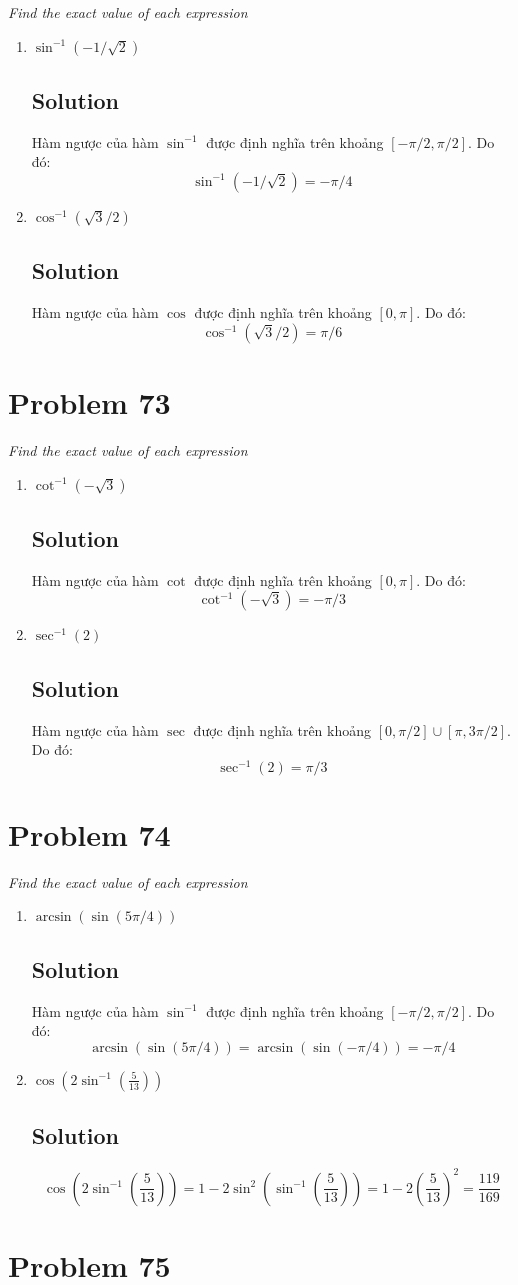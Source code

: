 \documentclass[11pt]{article}
\newcommand{\soln}{\subsection*}
\newcommand{\qn}{\textit}
\begin{document}
\qn{Find the exact value of each expression}
\begin{enumerate}
	\item \qn{$\sin^{-1}(-1/\sqrt{2})$}
	\soln{Solution}
	Hàm ngược của hàm $\sin^{-1}$ được định nghĩa trên khoảng $[-\pi/2,\pi/2]$. Do đó: $$\sin^{-1}(-1/\sqrt{2})=-\pi/4$$
	
	\item \qn{$\cos^{-1}(\sqrt{3}/2)$}
	\soln{Solution}
	Hàm ngược của hàm $\cos$ được định nghĩa trên khoảng $[0,\pi]$. Do đó: $$\cos^{-1}(\sqrt{3}/2)=\pi/6$$
\end{enumerate}

\section*{Problem 73}

\qn{Find the exact value of each expression}
\begin{enumerate}
	\item \qn{$\cot^{-1}(-\sqrt{3})$}
	\soln{Solution}
	Hàm ngược của hàm $\cot$ được định nghĩa trên khoảng $[0,\pi]$. Do đó: $$\cot^{-1}(-\sqrt{3})=-\pi/3$$
	
	\item \qn{$\sec^{-1}(2)$}
	\soln{Solution}
	Hàm ngược của hàm $\sec$ được định nghĩa trên khoảng $[0,\pi/2] \cup [\pi,3\pi/2]$. Do đó: $$\sec^{-1}(2)=\pi/3$$
\end{enumerate}

\section*{Problem 74}

\qn{Find the exact value of each expression}
\begin{enumerate}
	\item \qn{$\arcsin(\sin(5\pi/4))$}
	\soln{Solution}
	Hàm ngược của hàm $\sin^{-1}$ được định nghĩa trên khoảng $[-\pi/2,\pi/2]$. Do đó:
	$$\arcsin(\sin(5\pi/4))=\arcsin(\sin(-\pi/4))=-\pi/4$$
	
	\item \qn{$\cos(2\sin^{-1}(\frac{5}{13}))$}
	\soln{Solution}
	$$\cos(2\sin^{-1}(\frac{5}{13}))=1-2\sin^2(\sin^{-1}(\frac{5}{13}))=1-2(\frac{5}{13})^2=\frac{119}{169}$$
\end{enumerate}

\section*{Problem 75}
\end{document}
